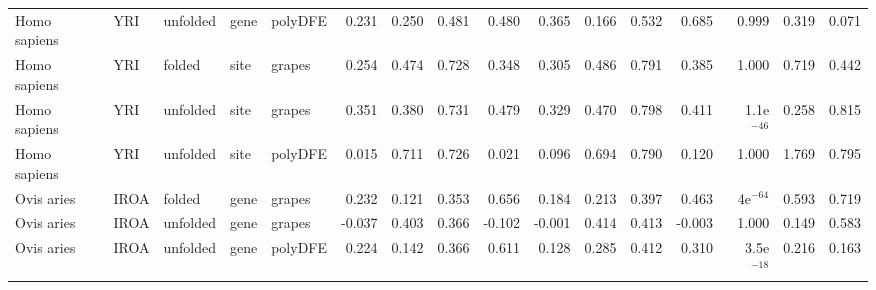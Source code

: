 \begin{longtable}{lllllrrrrrrrrrrr}
        Homo sapiens &                       YRI &  unfolded &  gene &  polyDFE &                              0.231 &                               0.250 &                 0.481 &                 0.480 &                              0.365 &                               0.166 &                 0.532 &                 0.685 &         0.999 &  0.319 &  0.071 \\
        Homo sapiens &                       YRI &    folded &  site &   grapes &                              0.254 &                               0.474 &                 0.728 &                 0.348 &                              0.305 &                               0.486 &                 0.791 &                 0.385 &         1.000 &  0.719 &  0.442 \\
        Homo sapiens &                       YRI &  unfolded &  site &   grapes &                              0.351 &                               0.380 &                 0.731 &                 0.479 &                              0.329 &                               0.470 &                 0.798 &                 0.411 &  1.1e$^{-46}$ &  0.258 &  0.815 \\
        Homo sapiens &                       YRI &  unfolded &  site &  polyDFE &                              0.015 &                               0.711 &                 0.726 &                 0.021 &                              0.096 &                               0.694 &                 0.790 &                 0.120 &         1.000 &  1.769 &  0.795 \\
          Ovis aries &                      IROA &    folded &  gene &   grapes &                              0.232 &                               0.121 &                 0.353 &                 0.656 &                              0.184 &                               0.213 &                 0.397 &                 0.463 &    4e$^{-64}$ &  0.593 &  0.719 \\
          Ovis aries &                      IROA &  unfolded &  gene &   grapes &                             -0.037 &                               0.403 &                 0.366 &                -0.102 &                             -0.001 &                               0.414 &                 0.413 &                -0.003 &         1.000 &  0.149 &  0.583 \\
          Ovis aries &                      IROA &  unfolded &  gene &  polyDFE &                              0.224 &                               0.142 &                 0.366 &                 0.611 &                              0.128 &                               0.285 &                 0.412 &                 0.310 &  3.5e$^{-18}$ &  0.216 &  0.163 \\

\end{longtable}
